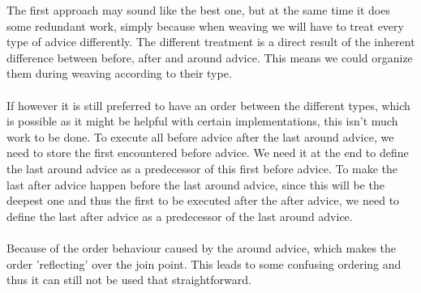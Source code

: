 \documentclass[a4paper]{report}
\begin{document}
The first approach may sound like the best one, but at the same time it does some redundant work, simply because when weaving we will have to treat every type of advice differently. The different treatment is a direct result of the inherent difference between before, after and around advice. This means we could organize them during weaving according to their type.\\
\\
If however it is still preferred to have an order between the different types, which is possible as it might be helpful with certain implementations, this isn't much work to be done. To execute all before advice after the last around advice, we need to store the first encountered before advice. We need it at the end to define the last around advice as a predecessor of this first before advice. To make the last after advice happen before the last around advice, since this will be the deepest one and thus the first to be executed after the after advice, we need to define the last after advice as a predecessor of the last around advice. \\
\\
Because of the order behaviour caused by the around advice, which makes the order 'reflecting' over the join point. This leads to some confusing ordering and thus it can still not be used that straightforward.
\end{document}
